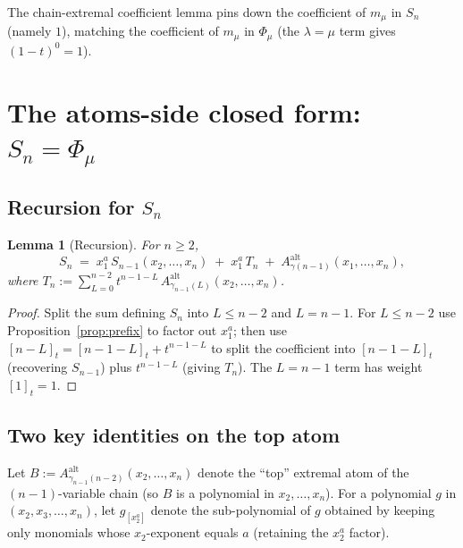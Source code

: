 \documentclass[11pt]{article}
\newtheorem{lemma}[theorem]{Lemma}
\theoremstyle{definition}
\newcommand{\Aalt}{A^{\mathrm{alt}}}
\newcommand{\gauss}[1]{[#1]_t}
\begin{document}
The chain-extremal coefficient lemma pins down the coefficient of $m_\mu$
in $S_n$ (namely $1$), matching the coefficient of $m_\mu$ in $\Phi_\mu$
(the $\lambda = \mu$ term gives $(1-t)^0 = 1$).

\section{The atoms-side closed form: $S_n = \Phi_\mu$}\label{sec:S-closed}

\subsection{Recursion for $S_n$}

\begin{lemma}[Recursion]\label{lem:recursion}
For $n \ge 2$,
\begin{equation}\label{eq:recursion}
  S_n \;=\; x_1^a\, S_{n-1}(x_2, \ldots, x_n) \;+\; x_1^a\, T_n \;+\; \Aalt_{\gamma(n-1)}(x_1, \ldots, x_n),
\end{equation}
where $T_n := \sum_{L=0}^{n-2} t^{n-1-L}\, \Aalt_{\gamma_{n-1}(L)}(x_2, \ldots, x_n)$.
\end{lemma}
\begin{proof}
Split the sum defining $S_n$ into $L \le n - 2$ and $L = n - 1$. For
$L \le n-2$ use Proposition~\ref{prop:prefix} to factor out $x_1^a$; then
use $\gauss{n-L} = \gauss{n-1-L} + t^{n-1-L}$ to split the coefficient into
$\gauss{n-1-L}$ (recovering $S_{n-1}$) plus $t^{n-1-L}$ (giving $T_n$).
The $L = n-1$ term has weight $\gauss{1} = 1$.
\end{proof}

\subsection{Two key identities on the top atom}

Let $B := \Aalt_{\gamma_{n-1}(n-2)}(x_2, \ldots, x_n)$ denote the ``top''
extremal atom of the $(n-1)$-variable chain (so $B$ is a polynomial in
$x_2, \ldots, x_n$). For a polynomial $g$ in $(x_2, x_3, \ldots, x_n)$, let
$g_{[x_2^a]}$ denote the sub-polynomial of $g$ obtained by keeping only
monomials whose $x_2$-exponent equals $a$ (retaining the $x_2^a$ factor).
\end{document}
